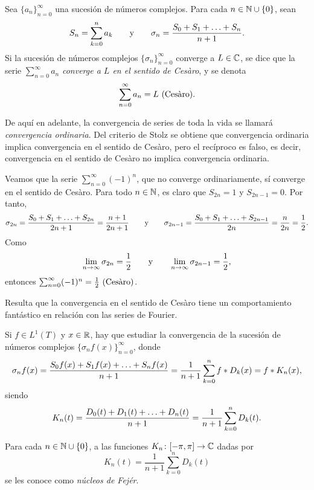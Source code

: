 \documentclass[a4paper, 11pt, oneside]{report}
\begin{document}
\begin{definition}
  Sea $\{a_n\}_{n=0}^\infty$ una sucesión de números complejos. Para cada $n \in \N \cup \{0\}$, sean
  \[S_n = \sum_{k=0}^n a_k \qquad \textup{y} \qquad \sigma_n = \frac{S_0+S_1+\mathellipsis+S_n}{n+1}.\]
  Si la sucesión de números complejos $\{\sigma_n\}_{n=0}^\infty$ converge a $L \in \C$, se dice que la serie $\sum_{n=0}^\infty a_n$ \emph{converge a $L$ en el sentido de Cesàro}, y se denota
  \[\sum_{n=0}^\infty a_n = L \cesaro.\]
\end{definition}

De aquí en adelante, la convergencia de series de toda la vida se llamará \emph{convergencia ordinaria}. Del criterio de Stolz se obtiene que convergencia ordinaria implica convergencia en el sentido de Cesàro, pero el recíproco es falso, es decir, convergencia en el sentido de Cesàro no implica convergencia ordinaria.

\begin{example}
  Veamos que la serie $\sum_{n=0}^\infty (-1)^n$, que no converge ordinariamente, sí converge en el sentido de Cesàro. Para todo $n \in \N$, es claro que $S_{2n} = 1$ y $S_{2n-1} = 0$. Por tanto,
  \[\sigma_{2n} = \frac{S_0 + S_1 + \mathellipsis + S_{2n}}{2n+1} = \frac{n+1}{2n+1} \qquad \textup{y} \qquad \sigma_{2n-1} = \frac{S_0 + S_1 + \mathellipsis + S_{2n-1}}{2n} = \frac{n}{2n} = \frac{1}{2}.\]
  Como 
  \[\lim_{n \to \infty} \sigma_{2n} = \frac{1}{2} \qquad \textup{y} \qquad \lim_{n \to \infty} \sigma_{2n-1} = \frac{1}{2},\]
  entonces $\sum_{n=0}^\infty (-1)^n = \frac{1}{2} \cesaro$.
\end{example}

Resulta que la convergencia en el sentido de Cesàro tiene un comportamiento fantástico en relación con las series de Fourier.

Si $f \in L^1(T)$ y $x \in \R$, hay que estudiar la convergencia de la sucesión de números complejos $\{\sigma_nf(x)\}_{n=0}^\infty$, donde
\[\sigma_nf(x) = \frac{S_0f(x)+S_1f(x)+\mathellipsis+S_nf(x)}{n+1} = \frac{1}{n+1}\sum_{k=0}^n f \ast D_k(x) = f \ast K_n(x),\]
siendo
\[K_n(t) = \frac{D_0(t)+D_1(t)+\mathellipsis+D_n(t)}{n+1} = \frac{1}{n+1}\sum_{k=0}^n D_k(t).\]

\begin{definition}
  Para cada $n \in \N \cup \{0\}$, a las funciones $K_n \colon [-\pi,\pi] \to \C$ dadas por 
  \[K_n(t) = \frac{1}{n+1}\sum_{k=0}^n D_k(t)\]
  se les conoce como \emph{núcleos de Fejér}.
\end{definition}
\end{document}
